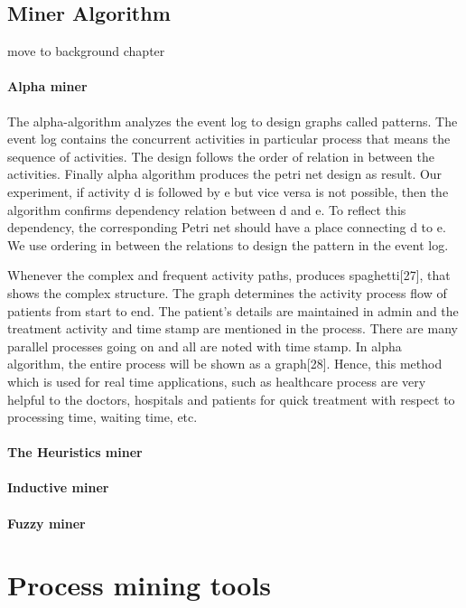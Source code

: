 \subsection{Miner Algorithm}
\todo move to background chapter

\paragraph{Alpha miner}

The alpha-algorithm analyzes the event log to design graphs called patterns. The event log contains the concurrent activities in particular process that means the sequence of activities. The design follows the order of relation in between the activities. Finally alpha algorithm produces the petri net design as result. Our experiment, if activity d is followed by e but vice versa is not possible, then the algorithm confirms dependency relation between d and e. To reflect this dependency, the corresponding Petri net should have a place connecting d to e. We use ordering in between the relations to design the pattern in the event log.

Whenever the complex and frequent activity paths, produces spaghetti[27], that shows the complex structure. The graph determines the activity process flow of patients from start to end. The patient’s details are maintained in admin and the treatment activity and time stamp are mentioned in the process. There are many parallel processes going on and all are noted with time stamp. In alpha algorithm, the entire process will be shown as a graph[28]. Hence, this method which is used for real time applications, such as healthcare process are very helpful to the doctors, hospitals and patients for quick treatment with respect to processing time, waiting time, etc.

\paragraph{The Heuristics miner}
\paragraph{Inductive miner}
\paragraph{Fuzzy miner}






\section{Process mining tools}
